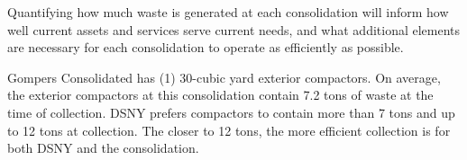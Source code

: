 
    Quantifying how much waste is generated at each consolidation will inform how well current assets and services serve current needs, and what additional elements are necessary for each consolidation to operate as efficiently as possible.
    
    Gompers Consolidated has (1) 30-cubic yard exterior compactors. On average, the exterior compactors at this consolidation contain 7.2 tons of waste at the time of collection. DSNY prefers compactors to contain more than 7 tons and up to 12 tons at collection. The closer to 12 tons, the more efficient collection is for both DSNY and the consolidation.